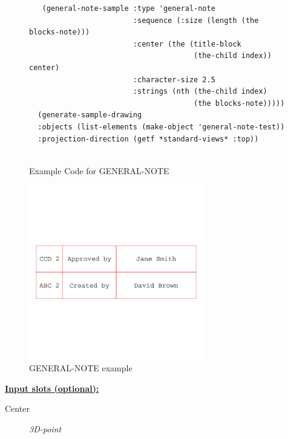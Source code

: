 \documentclass [11pt]{book}
\begin{document}
\begin{itemize}
\begin{figure}
\begin{lrbox}{\boxedverb}
\begin{minipage}{\linewidth}
{\begin{verbatim}
   (general-note-sample :type 'general-note
                        :sequence (:size (length (the blocks-note)))
                        :center (the (title-block 
                                      (the-child index)) center)
                        :character-size 2.5
                        :strings (nth (the-child index) 
                                      (the blocks-note)))))
  (generate-sample-drawing 
  :objects (list-elements (make-object 'general-note-test)) 
  :projection-direction (getf *standard-views* :top))


\end{verbatim}}
\end{minipage}
\end{lrbox}
\fbox{\usebox{\boxedverb}}

\caption{Example Code for GENERAL-NOTE}

\label{fig:example-code-GENERAL-NOTE}

\end{figure}

\begin{figure}
\begin{center}
\includegraphics[width=3in,height=3in]{../images/example-GENERAL-NOTE.pdf}
\end{center}

\caption{GENERAL-NOTE example}

\label{fig:GENERAL-NOTE}

\end{figure}





\textbf{
\underline{Input slots (optional):}}

\begin{description}

\item [Center]
\emph{3D-point}


\end{description}
\end{itemize}
\end{document}
